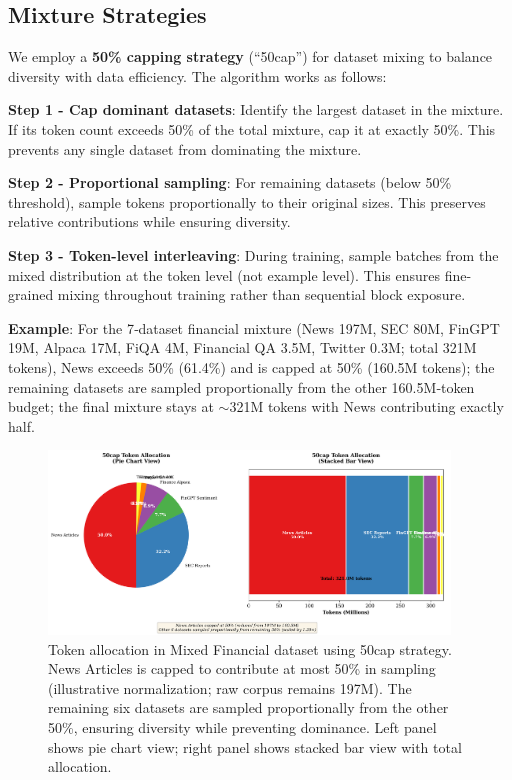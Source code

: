 \subsection{Mixture Strategies}

We employ a \textbf{50\% capping strategy} (``50cap'') for dataset mixing to balance diversity with data efficiency. The algorithm works as follows:

\textbf{Step 1 - Cap dominant datasets}: Identify the largest dataset in the mixture. If its token count exceeds 50\% of the total mixture, cap it at exactly 50\%. This prevents any single dataset from dominating the mixture.

\textbf{Step 2 - Proportional sampling}: For remaining datasets (below 50\% threshold), sample tokens proportionally to their original sizes. This preserves relative contributions while ensuring diversity.

\textbf{Step 3 - Token-level interleaving}: During training, sample batches from the mixed distribution at the token level (not example level). This ensures fine-grained mixing throughout training rather than sequential block exposure.

\textbf{Example}: For the 7‑dataset financial mixture (News 197M, SEC 80M, FinGPT 19M, Alpaca 17M, FiQA 4M, Financial QA 3.5M, Twitter 0.3M; total 321M tokens), News exceeds 50\% (61.4\%) and is capped at 50\% (160.5M tokens); the remaining datasets are sampled proportionally from the other 160.5M‑token budget; the final mixture stays at $\sim$321M tokens with News contributing exactly half.

\begin{figure}[h]
\centering
\includegraphics[width=0.95\textwidth]{figures/diagram_50cap.png}
\caption[50cap Mixture Strategy Visualization]{Token allocation in Mixed Financial dataset using 50cap strategy. News Articles is capped to contribute at most 50\% in sampling (illustrative normalization; raw corpus remains 197M). The remaining six datasets are sampled proportionally from the other 50\%, ensuring diversity while preventing dominance. Left panel shows pie chart view; right panel shows stacked bar view with total allocation.}
\label{fig:diagram_50cap}
\end{figure}

